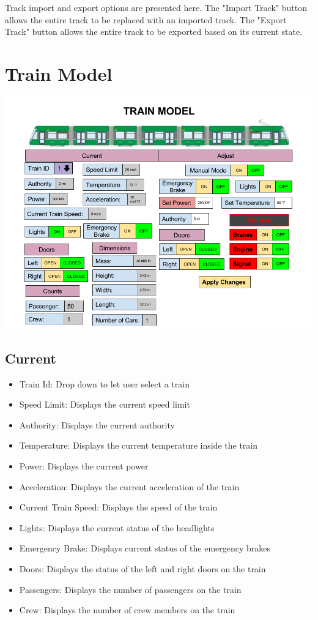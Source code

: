 \documentclass{scrreprt}
\begin{document}
Track import and export options are presented here. The "Import Track" button allows
the entire track to be replaced with an imported track. The "Export Track" button allows
the entire track to be exported based on its current state.

\chapter{Train Model}

\includegraphics[width=\textwidth]{TrainModelUI}

\section{Current}
\begin{itemize}
    \item Train Id: Drop down to let user select a train
    \item Speed Limit: Displays the current speed limit
    \item Authority: Displays the current authority
    \item Temperature: Displays the current temperature inside the train
    \item Power: Displays the current power
    \item Acceleration: Displays the current acceleration of the train
    \item Current Train Speed: Displays the speed of the train
    \item Lights: Displays the current status of the headlights
    \item Emergency Brake: Displays current status of the emergency brakes
    \item Doors: Displays the status of the left and right doors on the train
    \item Passengers: Displays the number of passengers on the train
    \item Crew: Displays the number of crew members on the train
\end{itemize}
\end{document}
